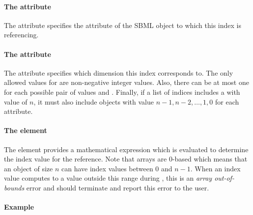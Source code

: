 \paragraph{The  attribute}

The  attribute specifies the attribute of the SBML object to which this index is referencing.

\paragraph{The  attribute}

The  attribute specifies which dimension this index corresponds to.
The only allowed values for  are
  non-negative integer values. Also, there can be at most one \Index for
  each possible pair of values
 and . Finally, if a list of indices includes a
\Index with  value of $n$, it must also
include \Index objects with value $n-1, n-2, \dots , 1, 0$ for each  attribute.

\paragraph{The  element}

The  element provides a mathematical expression which is evaluated to determine the index value for the reference.   Note that arrays are 0-based which means that an object of size $n$ can have index values between 0 and $n-1$.   When an index value computes to a value outside this range during , this is an \emph{array out-of-bounds} error and  should terminate and report this error to the user.

\paragraph{Example}

